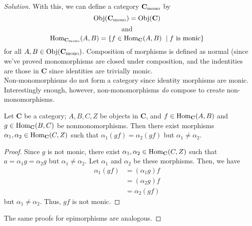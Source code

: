\documentclass[12pt]{article}
\newenvironment{proposition}[1][Proposition]{\begin{trivlist}
\item[\hskip \labelsep {\bfseries #1.}]}{\end{trivlist}}
\newcommand{\catname}[1]{\normalfont\textbf{#1}}
\newcommand{\Hom}{\text{Hom}}
\newcommand{\Objj}{\text{Obj}}
\newcommand{\Obj}[1]{\text{Obj}(\catname{C})}
\newenvironment{solution}
  {\renewcommand\qedsymbol{$\blacksquare$}\begin{proof}[Solution]}
{\end{proof}}
\newenvironment{sproof}{
  \renewcommand\qedsymbol{$\square$}
  \begin{proof}
  }{
  \end{proof}
}
\begin{document}
\begin{solution}
      With this, we can define a category $\catname{C}_\text{mono}$ by 
      \begin{equation*}
        \Objj(\catname{C}_\text{mono}) = \Obj{C}
      \end{equation*} 
      \[\text{and} \]
      \begin{equation*}
        \Hom_{\catname{C}_\text{mono}}(A,B) = \{f \in \Hom_{\catname{C}}(A,B)\ \mid f \text{ is monic}\}
      \end{equation*} 
      for all $A, B \in \Objj(\catname{C}_\text{mono})$.
      Composition of morphisms is defined as normal (since we've proved monomorphisms are closed under composition, and the indentities are those in \catname{C} since identities are trivially monic. \\
        Non-monomorphisms do not form a category since identity morphisms are monic. 
        Interestingly enough, however, non-monomorphisms \textit{do} compose to create non-monomorphisms.
        \begin{proposition}
          Let \catname{C} be a category;
          $A,B,C,Z$ be objects in \catname{C}, and
          $f\in \Hom_{\catname{C}}(A,B)$ and
          $g\in \Hom_{\catname{C}}(B,C)$
          be nonmonomorphisms. Then there exist morphisms
          $\alpha_1, \alpha_2 \in \Hom_{\catname{C}}(C,Z)$ such that
          $\alpha_1(gf) = \alpha_2(gf)$ but $\alpha_1\neq \alpha_2$.
        \end{proposition}
        \begin{sproof}
          Since $g$ is not monic, there exist $\alpha_1, \alpha_2 \in \Hom_{\catname{C}}(C,Z)$ such that $a=\alpha_1g = \alpha_2g$ but $\alpha_1\neq \alpha_2$. 
          Let $\alpha_1$ and $\alpha_2$ be these morphisms. Then, we have
          \begin{align*}
            \alpha_1(gf) &= (\alpha_1g)f\\
            &= (\alpha_2g)f \\
            &= \alpha_2(gf)
          \end{align*}
          but $\alpha_1\neq \alpha_2$. Thus, $gf$ is not monic.
        \end{sproof}
        The same proofs for epimorphisms are analogous.
\end{solution}

\newpage
\end{document}

